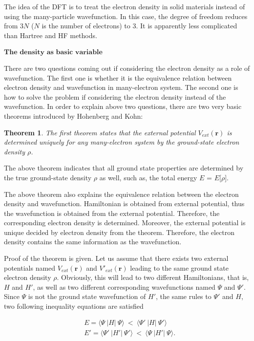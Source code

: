 \documentclass[a4paper, 12pt, titlepage,oneside,drop]{kthesis}
\newtheorem{thm}{Theorem}
\begin{document}
The idea of the DFT is to treat the electron density in solid materials instead of using the many-particle wavefunction. In this case, the degree of freedom reduces from 3$N$ ($N$ is the number of electrons) to 3.
It is apparently less complicated than Hartree and HF methods. 

$\textbf{The density as basic variable}$ 

There are two questions coming out if considering the electron density as a role of wavefunction. The first one is whether it is the equivalence relation between electron density and wavefunction in many-electron system. 
The second one is how to solve the problem if considering the electron density instead of the wavefunction. In order to explain above two questions, there are two very basic theorems introduced by Hohenberg and Kohn:

\begin{thm}
\label{hk1}
\noindent The first theorem states that the external potential $V_{ext}(\textbf{r})$  is determined uniquely for any many-electron system by the ground-state electron density $\rho$.
\end{thm}

The above theorem indicates that all ground state properties are determined by the true ground-state density $\rho$ as well,
such as, the total energy $E$ = $E$[$\rho$]. 

The above theorem also explains the equivalence relation between the electron density and wavefunction. Hamiltonian is obtained from external potential,
thus the wavefunction is obtained from the external potential. Therefore, the corresponding electron density is determined. Moreover, the external potential is unique decided by electron
density from the theorem. Therefore, the electron density contains the same information as the wavefunction.

Proof of the theorem is given. Let us assume that there exists two external potentials named $V_{ext}(\textbf{r})$ and $V'_{ext}(\textbf{r})$ leading to the same ground state 
electron density $\rho$. Obviously, this will lead to two different Hamiltonians, that is, ${H}$ and ${H'}$, as well as two different corresponding
wavefunctions named $\Psi$ and $\Psi'$. Since $\Psi$ is not the ground state wavefunction of ${H'}$, the same rules to $\Psi'$ and ${H}$, two following
inequality equations are satisfied

\begin{equation}\label{hkpf1}\begin{split}
&  E = \langle \Psi\ |{H}|\ \Psi \rangle  \ < \  \langle \Psi'\ |{H}|\ \Psi' \rangle \\
&  E' = \langle \Psi'\ |{H'}|\ \Psi' \rangle  \ < \  \langle \Psi\ |{H'}|\ \Psi \rangle.
\end{split}\end{equation}
\end{document}

